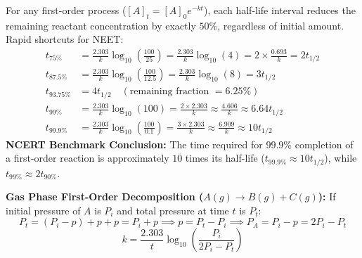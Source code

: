 \documentclass[10pt,twoside,openright]{book}
\begin{document}
\begin{ncertbox}
For any first-order process ($[A]_t = [A]_0 e^{-kt}$), each half-life interval reduces the remaining reactant concentration by exactly $50\%$, regardless of initial amount. Rapid shortcuts for NEET:
\begin{align*}
  t_{75\%} &= \frac{2.303}{k}\log_{10}\left(\frac{100}{25}\right) = \frac{2.303}{k}\log_{10}(4) = 2 \times \frac{0.693}{k} = 2 t_{1/2} \\
  t_{87.5\%} &= \frac{2.303}{k}\log_{10}\left(\frac{100}{12.5}\right) = \frac{2.303}{k}\log_{10}(8) = 3 t_{1/2} \\
  t_{93.75\%} &= 4 t_{1/2} \quad (\text{remaining fraction } = 6.25\%) \\
  t_{99\%} &= \frac{2.303}{k}\log_{10}(100) = \frac{2 \times 2.303}{k} \approx \frac{4.606}{k} \approx 6.64 t_{1/2} \\
  t_{99.9\%} &= \frac{2.303}{k}\log_{10}\left(\frac{100}{0.1}\right) = \frac{3 \times 2.303}{k} \approx \frac{6.909}{k} \approx 10 t_{1/2}
\end{align*}
\textbf{NCERT Benchmark Conclusion:} The time required for $99.9\%$ completion of a first-order reaction is approximately $10$ times its half-life ($t_{99.9\%} \approx 10 t_{1/2}$), while $t_{99\%} \approx 2 t_{90\%}$.
\end{ncertbox}
\textbf{Gas Phase First-Order Decomposition ($A(g) \to B(g) + C(g)$):}
If initial pressure of $A$ is $P_i$ and total pressure at time $t$ is $P_t$:
\begin{equation}
  P_t = (P_i - p) + p + p = P_i + p \implies p = P_t - P_i \implies P_A = P_i - p = 2P_i - P_t
\end{equation}
\begin{equation}
  k = \frac{2.303}{t}\log_{10}\left(\frac{P_i}{2P_i - P_t}\right)
\end{equation}
\end{document}
